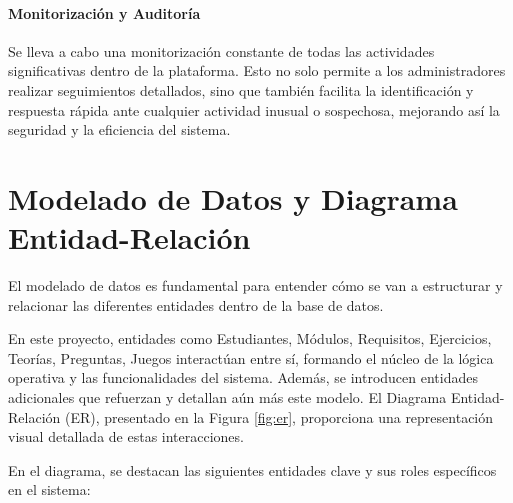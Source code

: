 \paragraph{Monitorización y Auditoría} Se lleva a cabo una monitorización constante de todas las actividades significativas dentro de la plataforma. Esto no solo permite a los administradores realizar seguimientos detallados, sino que también facilita la identificación y respuesta rápida ante cualquier actividad inusual o sospechosa, mejorando así la seguridad y la eficiencia del sistema.

\section{Modelado de Datos y Diagrama Entidad-Relación} \label{sec:er}

El modelado de datos es fundamental para entender cómo se van a estructurar y relacionar las diferentes entidades dentro de la base de datos. 

En este proyecto, entidades como Estudiantes, Módulos, Requisitos, Ejercicios, Teorías, Preguntas, Juegos interactúan entre sí, formando el núcleo de la lógica operativa y las funcionalidades del sistema. Además, se introducen entidades adicionales que refuerzan y detallan aún más este modelo. El Diagrama Entidad-Relación (ER), presentado en la Figura \ref{fig:er}, proporciona una representación visual detallada de estas interacciones.

En el diagrama, se destacan las siguientes entidades clave y sus roles específicos en el sistema:

